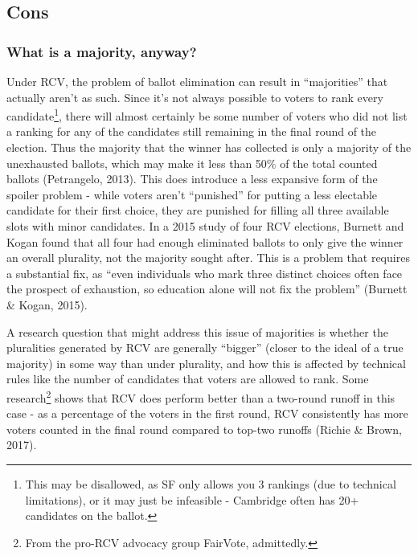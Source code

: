 \documentclass[12pt,twoside]{reedthesis}
\begin{document}
\hypertarget{cons}{%
\subsection{Cons}\label{cons}}

\hypertarget{what-is-a-majority-anyway}{%
\subsubsection{What is a majority, anyway?}\label{what-is-a-majority-anyway}}

Under RCV, the problem of ballot elimination can result in ``majorities'' that actually aren't as such. Since it's not always possible to voters to rank every candidate\footnote{This may be disallowed, as SF only allows you 3 rankings (due to technical limitations), or it may just be infeasible - Cambridge often has 20+ candidates on the ballot.}, there will almost certainly be some number of voters who did not list a ranking for any of the candidates still remaining in the final round of the election. Thus the majority that the winner has collected is only a majority of the unexhausted ballots, which may make it less than 50\% of the total counted ballots (Petrangelo, 2013). This does introduce a less expansive form of the spoiler problem - while voters aren't ``punished'' for putting a less electable candidate for their first choice, they are punished for filling all three available slots with minor candidates. In a 2015 study of four RCV elections, Burnett and Kogan found that all four had enough eliminated ballots to only give the winner an overall plurality, not the majority sought after. This is a problem that requires a substantial fix, as ``even individuals who mark three distinct choices often face the prospect of exhaustion, so education alone will not fix the problem'' (Burnett \& Kogan, 2015).

A research question that might address this issue of majorities is whether the pluralities generated by RCV are generally ``bigger'' (closer to the ideal of a true majority) in some way than under plurality, and how this is affected by technical rules like the number of candidates that voters are allowed to rank. Some research\footnote{From the pro-RCV advocacy group FairVote, admittedly.} shows that RCV does perform better than a two-round runoff in this case - as a percentage of the voters in the first round, RCV consistently has more voters counted in the final round compared to top-two runoffs (Richie \& Brown, 2017).
\end{document}
